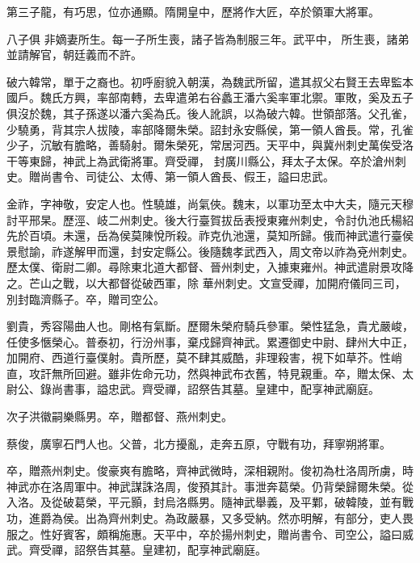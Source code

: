 \begin{pinyinscope}
 第三子龍，有巧思，位亦通顯。隋開皇中，歷將作大匠，卒於領軍大將軍。



 八子俱
 非嫡妻所生。每一子所生喪，諸子皆為制服三年。武平中，所生喪，諸弟並請解官，朝廷義而不許。



 破六韓常，單于之裔也。初呼廚貌入朝漢，為魏武所留，遣其叔父右賢王去卑監本國戶。魏氏方興，率部南轉，去卑遣弟右谷蠡王潘六奚率軍北禦。軍敗，奚及五子俱沒於魏，其子孫遂以潘六奚為氏。後人訛誤，以為破六韓。世領部落。父孔雀，少驍勇，背其宗人拔陵，率部降爾朱榮。詔封永安縣侯，第一領人酋長。常，孔雀少子，沉敏有膽略，善騎射。爾朱榮死，常居河西。天平中，與冀州刺史萬俟受洛干等東歸，神武上為武衛將軍。齊受禪，
 封廣川縣公，拜太子太保。卒於滄州刺史。贈尚書令、司徒公、太傅、第一領人酋長、假王，謚曰忠武。



 金祚，字神敬，安定人也。性驍雄，尚氣俠。魏末，以軍功至太中大夫，隨元天穆討平邢杲。歷涇、岐二州刺史。後大行臺賀拔岳表授東雍州刺史，令討仇池氏楊紹先於百頃。未還，岳為侯莫陳悅所殺。祚克仇池還，莫知所歸。俄而神武遣行臺侯景慰諭，祚遂解甲而還，封安定縣公。後隨魏孝武西入，周文帝以祚為兗州刺史。歷太僕、衛尉二卿。尋除東北道大都督、晉州刺史，入據東雍州。神武遣尉景攻降之。芒山之戰，以大都督從破西軍，除
 華州刺史。文宣受禪，加開府儀同三司，別封臨濟縣子。卒，贈司空公。



 劉貴，秀容陽曲人也。剛格有氣斷。歷爾朱榮府騎兵參軍。榮性猛急，貴尤嚴峻，任使多愜榮心。普泰初，行汾州事，棄戍歸齊神武。累遷御史中尉、肆州大中正，加開府、西道行臺僕射。貴所歷，莫不肆其威酷，非理殺害，視下如草芥。性峭直，攻訐無所回避。雖非佐命元功，然與神武布衣舊，特見親重。卒，贈太保、太尉公、錄尚書事，謚忠武。齊受禪，詔祭告其墓。皇建中，配享神武廟庭。



 次子洪徽嗣樂縣男。卒，贈都督、燕州刺史。



 蔡俊，廣寧石門人也。父普，北方擾亂，走奔五原，守戰有功，拜寧朔將軍。



 卒，贈燕州刺史。俊豪爽有膽略，齊神武微時，深相親附。俊初為杜洛周所虜，時神武亦在洛周軍中。神武謀誅洛周，俊預其計。事泄奔葛榮。仍背榮歸爾朱榮。從入洛。及從破葛榮，平元顥，封烏洛縣男。隨神武舉義，及平鄴，破韓陵，並有戰功，進爵為侯。出為齊州刺史。為政嚴暴，又多受納。然亦明解，有部分，吏人畏服之。性好賓客，頗稱施惠。天平中，卒於揚州刺史，贈尚書令、司空公，謚曰威武。齊受禪，詔祭告其墓。皇建初，配享神武廟庭。




\end{pinyinscope}
